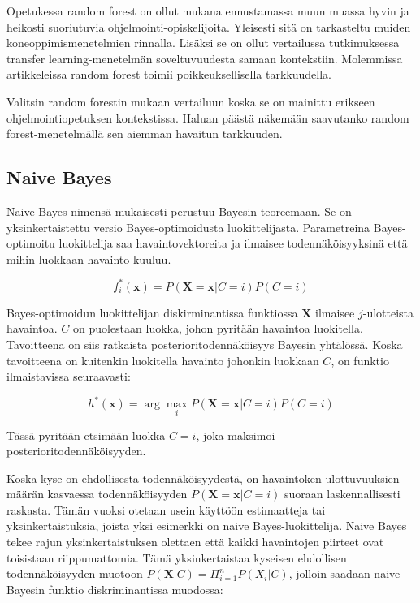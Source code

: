 \documentclass[finnish,twoside,openright]{HYgraduMLDS}
\begin{document}
Opetukessa random forest on ollut mukana ennustamassa muun muassa hyvin ja heikosti suoriutuvia ohjelmointi-opiskelijoita. Yleisesti sitä on tarkasteltu muiden koneoppimismenetelmien rinnalla\cite{Ahadi:2015:EML:2787622.2787717}. Lisäksi se on ollut vertailussa tutkimuksessa transfer learning-menetelmän soveltuvuudesta samaan kontekstiin\cite{lagus2018transfer}. Molemmissa artikkeleissa random forest toimii poikkeuksellisella tarkkuudella.

Valitsin random forestin mukaan vertailuun koska se on mainittu erikseen ohjelmointiopetuksen kontekstissa. Haluan päästä näkemään saavutanko random forest-menetelmällä sen aiemman havaitun tarkkuuden.


\subsection{Naive Bayes}

Naive Bayes nimensä mukaisesti perustuu Bayesin teoreemaan. Se on yksinkertaistettu versio Bayes-optimoidusta luokittelijasta. Parametreina Bayes-optimoitu luokittelija saa havaintovektoreita ja ilmaisee todennäköisyyksinä että mihin luokkaan havainto kuuluu\cite{rish2001empirical}.

\begin{equation}
    f^*_i(\textbf{x}) = P(\textbf{X}=\textbf{x} | C=i) P(C=i)
\end{equation}

Bayes-optimoidun luokittelijan diskirminantissa funktiossa $\textbf{X}$ ilmaisee $j$-ulotteista havaintoa. $C$ on puolestaan luokka, johon pyritään havaintoa luokitella. Tavoitteena on siis ratkaista posterioritodennäköisyys Bayesin yhtälössä. Koska tavoitteena on kuitenkin luokitella havainto johonkin luokkaan $C$, on funktio ilmaistavissa seuraavasti\cite{rish2001empirical}:

\begin{equation}
    h^*(\textbf{x}) = \arg \max_i P(\textbf{X} = \textbf{x}|C=i) P(C = i)
\end{equation}

Tässä pyritään etsimään luokka $C = i$, joka maksimoi posterioritodennäköisyyden.

Koska kyse on ehdollisesta todennäköisyydestä, on havaintoken ulottuvuuksien määrän kasvaessa todennäköisyyden $P(\textbf{X} = \textbf{x}|C=i)$ suoraan laskennallisesti raskasta. Tämän vuoksi otetaan usein käyttöön estimaatteja tai yksinkertaistuksia, joista yksi esimerkki on naive Bayes-luokittelija. Naive Bayes tekee rajun yksinkertaistuksen olettaen että kaikki havaintojen piirteet ovat toisistaan riippumattomia. Tämä yksinkertaistaa kyseisen ehdollisen todennäköisyyden muotoon $P(\textbf{X}|C) = \Pi^n_{i=1} P(X_i | C)$, jolloin saadaan naive Bayesin funktio diskriminantissa muodossa:
\end{document}
